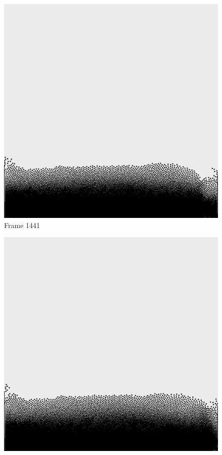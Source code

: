 \documentclass[a4paper, 12pt, oneside]{book}
\begin{document}
\begin{figure}[!ht]
    \addvspace{0.5ex}
        \begin{center}
            \includegraphics[width=\linewidth]{images/test_case_2/1441.png}
            Frame 1441
        \end{center}
    \endminipage
    \hfill
        \begin{center}
            \includegraphics[width=\linewidth]{images/test_case_2/1461.png}

\end{center}
\end{figure}
\end{document}

